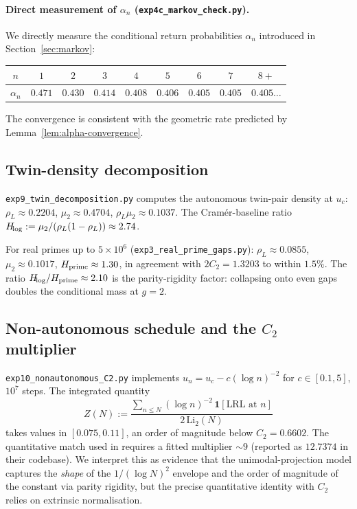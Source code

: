\paragraph{Direct measurement of $\alpha_n$
(\texttt{exp4c\_markov\_check.py}).}
We directly measure the conditional return probabilities $\alpha_n$
introduced in Section~\ref{sec:markov}:
\begin{center}
\begin{tabular}{c|cccccccc}
$n$ & $1$ & $2$ & $3$ & $4$ & $5$ & $6$ & $7$ & $8+$ \\
\hline
$\alpha_n$ & $0.471$ & $0.430$ & $0.414$ & $0.408$ & $0.406$ & $0.405$ & $0.405$ & $0.405\ldots$ \\
\end{tabular}
\end{center}
The convergence is consistent with the geometric rate predicted by
Lemma~\ref{lem:alpha-convergence}.

\subsection{Twin-density decomposition}
\label{app:exp-twin}

\texttt{exp9\_twin\_decomposition.py} computes the autonomous
twin-pair density at $u_c$:
$\rho_L \approx 0.2204$, $\mu_2 \approx 0.4704$,
$\rho_L \mu_2 \approx 0.1037$. The Cram\'er-baseline ratio
$H_{\!\rm log} := \mu_2 / (\rho_L (1 - \rho_L)) \approx 2.74$.

For real primes up to $5 \times 10^6$ (\texttt{exp3\_real\_prime\_gaps.py}):
$\rho_L \approx 0.0855$, $\mu_2 \approx 0.1017$, $H_{\rm prime} \approx 1.30$,
in agreement with $2 C_2 = 1.3203$ to within $1.5\%$. The ratio
$H_{\!\rm log}/H_{\rm prime} \approx 2.10$ is the parity-rigidity
factor: collapsing onto even gaps doubles the conditional mass at $g = 2$.

\subsection{Non-autonomous schedule and the $C_2$ multiplier}
\label{app:exp-nonauto}

\texttt{exp10\_nonautonomous\_C2.py} implements
$u_n = u_c - c (\log n)^{-2}$ for $c \in [0.1, 5]$, $10^7$ steps.
The integrated quantity
\[
    Z(N) := \frac{\sum_{n \leq N} (\log n)^{-2}\,\mathbf{1}[\text{LRL at } n]}
                  {2\,\mathrm{Li}_2(N)}
\]
takes values in $[0.075, 0.11]$, an order of magnitude below
$C_2 = 0.6602$. The quantitative match used in
\cite{wang2026emergence} requires a fitted multiplier $\sim 9$
(reported as $12.7374$ in their codebase). We interpret this as
evidence that the unimodal-projection model captures the
\emph{shape} of the $1/(\log N)^2$ envelope and the order of magnitude
of the constant via parity rigidity, but the precise quantitative
identity with $C_2$ relies on extrinsic normalisation.

